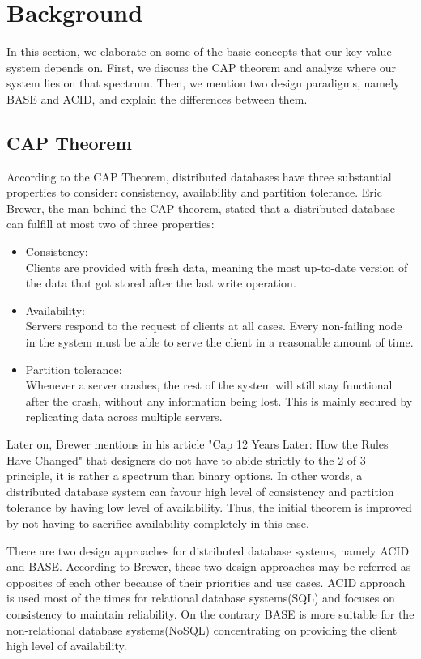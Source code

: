 \section{Background}
\label{sec:background}
In this section, we elaborate on some of the basic concepts that our key-value system depends on. First, we discuss the CAP theorem and analyze where our system lies on that spectrum. Then, we mention two design paradigms, namely BASE and ACID, and explain the differences between them.

\subsection{CAP Theorem}
\label{sec:background_cap} 
According to the CAP Theorem, distributed databases have three substantial properties to consider: consistency, availability and partition tolerance. Eric Brewer, the man behind the CAP theorem, stated that a distributed database can fulfill at most two of three properties\cite{brewer2000cap}:

\begin{itemize}
  \item Consistency: \\
  Clients are provided with fresh data, meaning the most up-to-date version of the data that got stored after the last write operation.
  \item Availability: \\
  Servers respond to the request of clients at all cases. Every non-failing node in the system must be able to serve the client in a reasonable amount of time.
  \item Partition tolerance: \\
  Whenever a server crashes, the rest of the system will still stay functional after the crash, without any information being lost. This is mainly secured by replicating data across multiple servers.
\end{itemize}

Later on, Brewer mentions in his article "Cap 12 Years Later: How the Rules Have Changed" that designers do not have to abide strictly to the 2 of 3 principle, it is rather a spectrum than binary options. In other words, a distributed database system can favour high level of consistency and partition tolerance by having low level of availability. Thus, the initial theorem is improved by not having to sacrifice availability completely in this case.

There are two design approaches for distributed database systems, namely ACID and BASE. According to Brewer, these two design approaches may be referred as opposites of each other\cite{brewer2012cap} because of their priorities and use cases. ACID approach is used most of the times for relational database systems(SQL) and focuses on consistency to maintain reliability. On the contrary BASE is more suitable for the non-relational database systems(NoSQL) concentrating on providing the client high level of availability\cite{brewer2000towards}.

